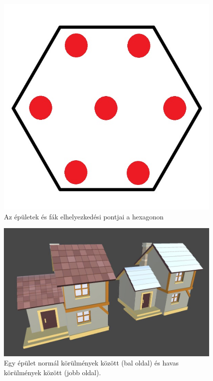 \begin{figure}[h!]
\centering
\includegraphics[scale=1.0]{kepek/img11_4_6_1.jpg}
\caption{Az épületek és fák elhelyezkedési pontjai a hexagonon}
\label{fig:img11_4_6_1}
\end{figure}

\begin{figure}[h!]
\centering
\includegraphics[scale=0.4]{kepek/img11_4_6_2.JPG}
\caption{Egy épület normál körülmények között (bal oldal) és havas körülmények között (jobb oldal).}
\label{fig:img11_4_6_2}
\end{figure}

